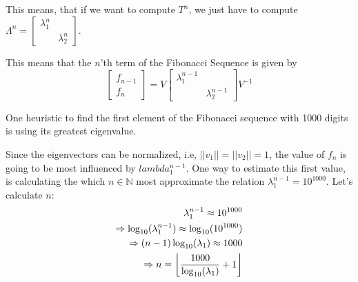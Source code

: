 \documentclass{article}
\DeclarePairedDelimiter\floor{\lfloor}{\rfloor}
\begin{document}
This means, that if we want to compute $T^n$, we just have to compute \\
$\Lambda ^n = \begin{bmatrix}
    \lambda_1 ^n & \\
    & \lambda_2 ^n
\end{bmatrix}$.

This means that the $n$'th term of the Fibonacci Sequence is given by
\begin{equation*}
    \begin{bmatrix}
        f_{n - 1}\\
        f_n
    \end{bmatrix} = V \begin{bmatrix}
        \lambda_1 ^{n - 1} & \\
    & \lambda_2 ^{n - 1}
    \end{bmatrix}V^{-1}
\end{equation*}

One heuristic to find the first element of the Fibonacci sequence with 1000
digits is using its greatest eigenvalue.

Since the eigenvectors can be normalized,
i.e, $||v_1|| = ||v_2|| = 1$, the value of $f_n$ is going to be most influenced
by $lambda_1^{n - 1}$.
\newpage
One way to estimate this first value, is calculating the which
$n \in \mathbb{N}$ most approximate the relation
$\lambda_1 ^{n - 1} = 10^{1000}$. Let's calculate $n$:
\begin{equation*}
    \begin{aligned}
        \lambda_1 ^{n - 1} \approx 10^{1000}\\
        \Rightarrow \log_{10}(\lambda_1 ^{n - 1}) \approx
                                            \log_{10}(10^{1000})\\
        \Rightarrow (n - 1) \log_{10}(\lambda_1)
                                    \approx 1000\\
        \Rightarrow n = \floor*{\dfrac{1000}{\log_{10}(\lambda_1)} + 1}
    \end{aligned}
\end{equation*}

\end{document}
